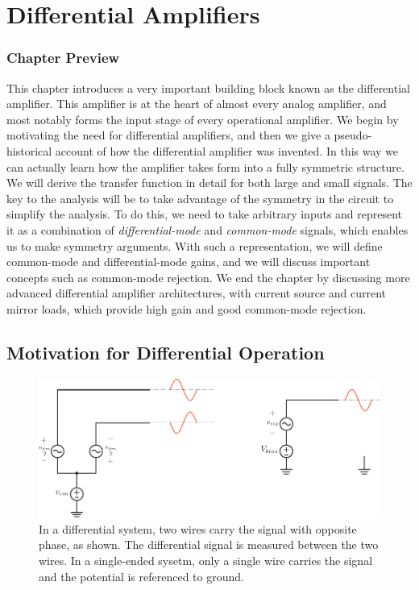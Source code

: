
\chapter{Differential Amplifiers}


\graphicspath{{./figs_diffamp/}}




\subsection{Chapter Preview}

This chapter introduces a very important building block known as the differential amplifier.  This amplifier is at the heart of almost every analog amplifier, and most notably forms the input stage of every operational amplifier.  We begin by motivating the need for differential amplifiers, and then we give a pseudo-historical account of how the differential amplifier was invented.  In this way we can actually learn how the amplifier takes form into a fully symmetric structure.  We will derive the transfer function in detail for both large and small signals.  The key to the analysis will be to take advantage of the symmetry in the circuit to simplify the analysis.  To do this, we need to take arbitrary inputs and represent it as a combination of \emph{differential-mode} and \emph{common-mode} signals, which enables us to make symmetry arguments.  With such a representation, we will define common-mode and differential-mode gains, and we will discuss important concepts such as common-mode rejection.  We end the chapter by discussing more advanced differential amplifier architectures, with current source and current mirror loads, which provide high gain and good common-mode rejection.

\section{Motivation for Differential Operation}

\begin{figure}[tb]
\begin{center}
\includegraphics[width=0.75\columnwidth]{diff_vs_cm.pdf} 
\end{center}
\caption{In a differential system, two wires carry the signal with opposite phase, as shown.  The differential signal is measured between the two wires.  In a single-ended sysetm, only a single wire carries the signal and the potential is referenced to ground. } \label{fig:diffckt}
\end{figure}



